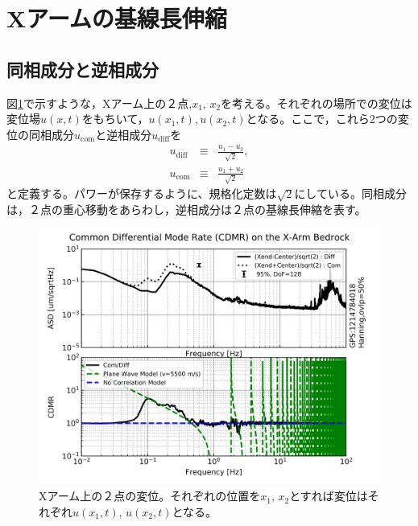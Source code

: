 
\section{Xアームの基線長伸縮}



\subsection{同相成分と逆相成分}
図\ref{img:img_diffcomm}で示すような，Xアーム上の２点,$x_1,\,x_2$を考える。それぞれの場所での変位は変位場$u(x,t)$をもちいて，$u(x_1,t),u(x_2,t)$となる。ここで，これら2つの変位の同相成分$u_{\mathrm{com}}$と逆相成分$u_\mathrm{diff}$を
\begin{eqnarray}\label{eq:eq22}
  u_{\mathrm{diff}} &\equiv& \frac{u_{1}-u_{2}}{\sqrt{2}}, \\
  u_{\mathrm{com}}  &\equiv& \frac{u_{1}+u_{2}}{\sqrt{2}}
\end{eqnarray}
と定義する。パワーが保存するように、規格化定数は$\sqrt{2}$にしている。同相成分は，２点の重心移動をあらわし，逆相成分は２点の基線長伸縮を表す。


\begin{figure}[H]
  \begin{center}
    \includegraphics[width=11.5cm]{./img_cdmr_xarm.png}
  \end{center}
  \caption{Xアーム上の２点の変位。それぞれの位置を$x_1,\,x_2$とすれば変位はそれぞれ$u(x_1,t),\,u(x_2,t)$となる。}\label{img:img_diffcomm}
\end{figure}


